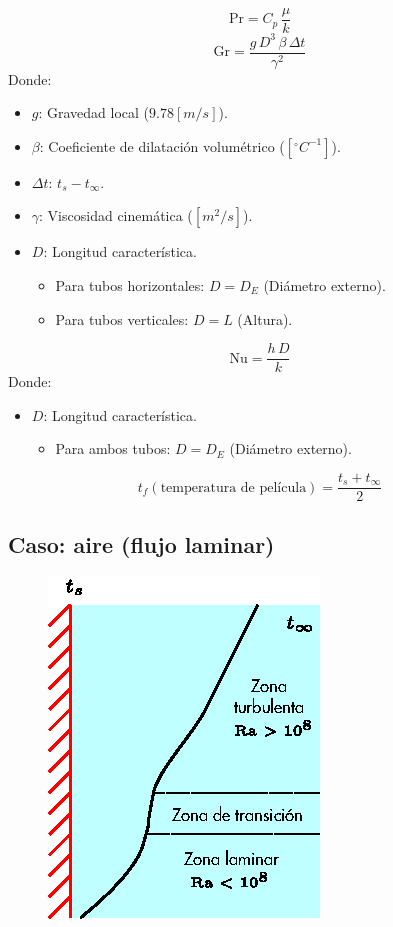 \begin{equation}
    \text{Pr} = C_p\,\frac{\mu}{k}
\end{equation}
\begin{equation}
    \text{Gr} = \frac{g\,D^3\,\beta\,\Delta t}{\gamma^2}
\end{equation}
Donde:
\begin{itemize}
    \item $g$: Gravedad local ($9.78 [m/s]$).
    \item $\beta$: Coeficiente de dilatación volumétrico ($[^\circ C^{-1}]$).
    \item $\Delta t$: $t_s - t_\infty$.
    \item $\gamma$: Viscosidad cinemática ($[m^2/s]$).
    \item $D$: Longitud característica.
        \begin{itemize}
            \item Para tubos horizontales: $D=D_E$ (Diámetro externo).
            \item Para tubos verticales: $D=L$ (Altura).
        \end{itemize}
\end{itemize}

\begin{equation}
    \text{Nu} = \frac{h\,D}{k}
\end{equation}
Donde:
\begin{itemize}
    \item $D$: Longitud característica.
        \begin{itemize}
            \item Para ambos tubos: $D=D_E$ (Diámetro externo).
        \end{itemize}
\end{itemize}

\begin{equation}
    t_f (\text{temperatura de película}) = \frac{t_s+t_\infty}{2}
\end{equation}

\subsection{Caso: aire (flujo laminar)}
\begin{figure}[!h]
\centering
\includegraphics[scale=1.44]{figura04_06.eps}
\end{figure}

